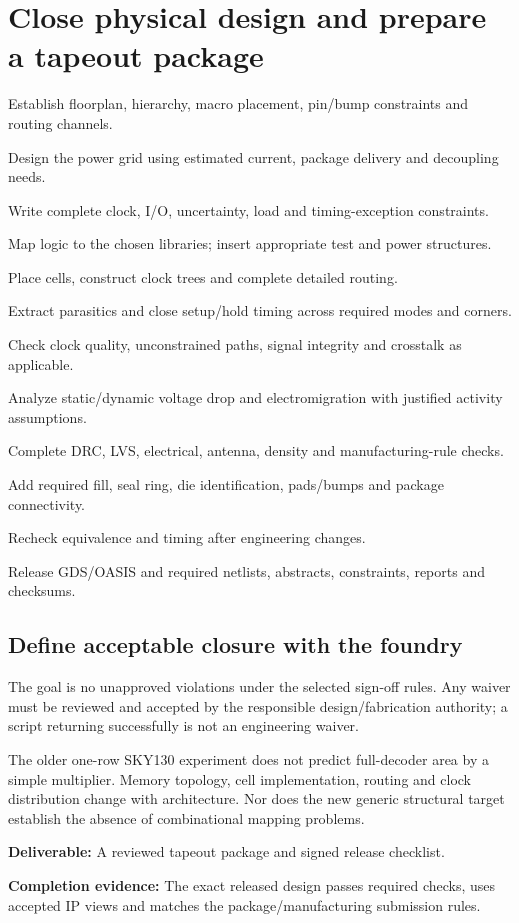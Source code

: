 \documentclass[11pt,a4paper]{article}
\newcommand{\phase}[2]{\clearpage\section{#1}\label{#2}}
\newcommand{\deliver}[2]{\begin{tcolorbox}[colback=pale,colframe=line,boxrule=0.5pt,arc=1mm,left=8pt,right=8pt,top=6pt,bottom=6pt]\textbf{Deliverable:} #1\par\textbf{Completion evidence:} #2\end{tcolorbox}}
\begin{document}
\phase{Close physical design and prepare a tapeout package}{sec:physical}
\begin{checklist}
\item Establish floorplan, hierarchy, macro placement, pin/bump constraints and routing channels.
\item Design the power grid using estimated current, package delivery and decoupling needs.
\item Write complete clock, I/O, uncertainty, load and timing-exception constraints.
\item Map logic to the chosen libraries; insert appropriate test and power structures.
\item Place cells, construct clock trees and complete detailed routing.
\item Extract parasitics and close setup/hold timing across required modes and corners.
\item Check clock quality, unconstrained paths, signal integrity and crosstalk as applicable.
\item Analyze static/dynamic voltage drop and electromigration with justified activity assumptions.
\item Complete DRC, LVS, electrical, antenna, density and manufacturing-rule checks.
\item Add required fill, seal ring, die identification, pads/bumps and package connectivity.
\item Recheck equivalence and timing after engineering changes.
\item Release GDS/OASIS and required netlists, abstracts, constraints, reports and checksums.
\end{checklist}
\subsection*{Define acceptable closure with the foundry}
The goal is no unapproved violations under the selected sign-off rules. Any
waiver must be reviewed and accepted by the responsible design/fabrication
authority; a script returning successfully is not an engineering waiver.

The older one-row SKY130 experiment does not predict full-decoder area by a
simple multiplier. Memory topology, cell implementation, routing and clock
distribution change with architecture. Nor does the new generic structural
target establish the absence of combinational mapping problems.
\deliver{A reviewed tapeout package and signed release checklist.}{The exact
released design passes required checks, uses accepted IP views and matches the
package/manufacturing submission rules.}
\end{document}
